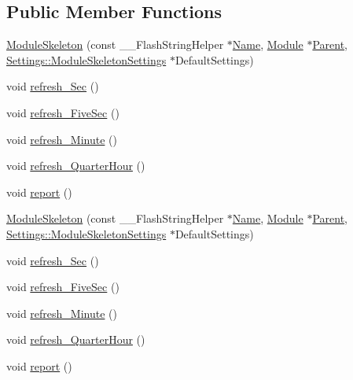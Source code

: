 \subsection*{Public Member Functions}
\begin{DoxyCompactItemize}
\item 
\hyperlink{class_module_skeleton_a28db770cfd6d6a02110d0adb62666676}{Module\+Skeleton} (const \+\_\+\+\_\+\+Flash\+String\+Helper $\ast$\hyperlink{class_common_aeea91a726dbe988e515057b32ba0726f}{Name}, \hyperlink{class_module}{Module} $\ast$\hyperlink{class_module_skeleton_a19e516bf8a16be02bb3b41c457a215bd}{Parent}, \hyperlink{struct_settings_1_1_module_skeleton_settings}{Settings\+::\+Module\+Skeleton\+Settings} $\ast$Default\+Settings)
\item 
void \hyperlink{class_module_skeleton_ae9b2578a2c1ecb343cd7b3b21320145e}{refresh\+\_\+\+Sec} ()
\item 
void \hyperlink{class_module_skeleton_a5c9845eec6ca7fbaac1521f4b021712a}{refresh\+\_\+\+Five\+Sec} ()
\item 
void \hyperlink{class_module_skeleton_ada46fe93dc55850a1ccfb80d2a4ee5dd}{refresh\+\_\+\+Minute} ()
\item 
void \hyperlink{class_module_skeleton_ade7e1fee2417a8e23a1f8f31502045ab}{refresh\+\_\+\+Quarter\+Hour} ()
\item 
void \hyperlink{class_module_skeleton_a4b13bbc3ce0282781e36f450bd4f189a}{report} ()
\item 
\hyperlink{class_module_skeleton_a28db770cfd6d6a02110d0adb62666676}{Module\+Skeleton} (const \+\_\+\+\_\+\+Flash\+String\+Helper $\ast$\hyperlink{class_common_aeea91a726dbe988e515057b32ba0726f}{Name}, \hyperlink{class_module}{Module} $\ast$\hyperlink{class_module_skeleton_a19e516bf8a16be02bb3b41c457a215bd}{Parent}, \hyperlink{struct_settings_1_1_module_skeleton_settings}{Settings\+::\+Module\+Skeleton\+Settings} $\ast$Default\+Settings)
\item 
void \hyperlink{class_module_skeleton_ae9b2578a2c1ecb343cd7b3b21320145e}{refresh\+\_\+\+Sec} ()
\item 
void \hyperlink{class_module_skeleton_a5c9845eec6ca7fbaac1521f4b021712a}{refresh\+\_\+\+Five\+Sec} ()
\item 
void \hyperlink{class_module_skeleton_ada46fe93dc55850a1ccfb80d2a4ee5dd}{refresh\+\_\+\+Minute} ()
\item 
void \hyperlink{class_module_skeleton_ade7e1fee2417a8e23a1f8f31502045ab}{refresh\+\_\+\+Quarter\+Hour} ()
\item 
void \hyperlink{class_module_skeleton_a4b13bbc3ce0282781e36f450bd4f189a}{report} ()
\end{DoxyCompactItemize}
